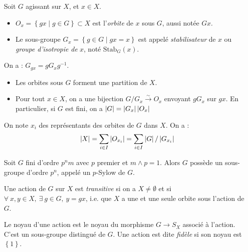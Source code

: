 \documentclass{cours}
\begin{document}
\begin{definition}
    Soit $G$ agissant sur $X$, et $x \in X$.
    \begin{itemize}
        \item $O_{x} = \left\{gx \mid g \in G\right\} \subset X$ est l'\emph{orbite} de $x$ sous $G$, aussi notée $Gx$.
        \item Le sous-groupe $G_{x} = \left\{g \in G \mid gx = x\right\}$ est appelé \emph{stabilisateur} de $x$ ou \emph{groupe d'isotropie de} $x$, noté $\text{Stab}_{G}(x)$.
    \end{itemize}
\end{definition}

\begin{lemma}
    On a : $G_{gx} = gG_{x}g^{-1}$.
\end{lemma}

\begin{proposition}
    \begin{itemize}
        \item Les orbites sous $G$ forment une partition de $X$. 
        \item Pour tout $x \in X$, on a une bijection $G/G_{x} \xrightarrow{\sim} O_{x}$ envoyant $gG_{x}$ sur $gx$. En particulier, si $G$ est fini, on a $\left|G\right| = \left|G_{x}\right|\left|O_{x}\right|$
    \end{itemize}
\end{proposition}

\begin{corollary}
    On note $x_{i}$ des représentants des orbites de $G$ dans $X$. On a : 
    \[
        \left|X\right| = \sum_{i\in I} \left|O_{x_{i}}\right| = \sum_{i\in I} \left|G\right|/\left|G_{x_{i}}\right|
    \]
\end{corollary}

\begin{theorem}
    Soit $G$ fini d'ordre $p^{n}m$ avec $p$ premier et $m \wedge p = 1$. Alors $G$ possède un sous-groupe d'ordre $p^{n}$, appelé un $p$-Sylow de $G$.
\end{theorem}

\begin{definition}
    Une action de $G$ sur $X$ est \emph{transitive} si on a $X \neq \emptyset$ et si $\forall\ x, y \in X,\ \exists \ g \in G, \ y = gx$, i.e. que $X$ a une et une seule orbite sous l'action de $G$.
\end{definition}

\begin{definition}
    Le noyau d'une action est le noyau du morphisme $G \rightarrow S_{X}$ associé à l'action. C'est un sous-groupe distingué de $G$. Une action est dite \emph{fidèle} si son noyau est $\left\{1\right\}$.
\end{definition}
\end{document}
